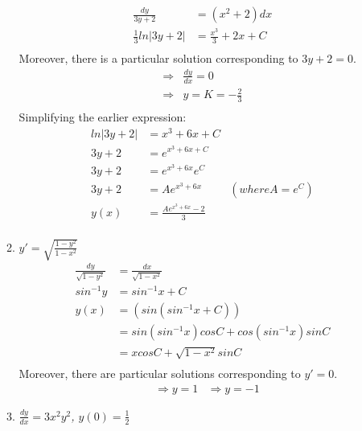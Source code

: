 \documentclass{article}
\begin{document}
\begin{enumerate}
\begin{enumerate}
\begin{align*}
                            \frac{dy}{3y+2}&=(x^2+2)dx \\
                            \frac{1}{3}ln|3y+2|&=\frac{x^3}{3}+2x+C \\
                        \end{align*}
                        Moreover, there is a particular solution corresponding to $3y+2=0$.
                        \begin{align*}
                            \Rightarrow& \frac{dy}{dx}=0 \\
                            \Rightarrow& y=K=-\frac{2}{3} \\
                        \end{align*}
                        Simplifying the earlier expression:
                        \begin{align*}
                            ln|3y+2|&=x^3+6x+C \\
                            3y+2&=e^{x^3+6x+C} \\
                            3y+2&=e^{x^3+6x}e^C \\
                            3y+2&=Ae^{x^3+6x}&(where A=e^C) \\
                            y(x)&=\frac{Ae^{x^3+6x}-2}{3} \\
                        \end{align*}
                    \item \textit{$y'=\sqrt{\frac{1-y^2}{1-x^2}}$}
                    \begin{align*}
                        \frac{dy}{\sqrt{1-y^2}}&=\frac{dx}{\sqrt{1-x^2}} \\
                        sin^{-1}y&=sin^{-1}x+C \\
                        y(x)&=(sin(sin^{-1}x+C)) \\
                        &=sin(sin^{-1}x)cosC+cos(sin^{-1}x)sinC \\
                        &=xcosC+\sqrt{1-x^2}sinC \\
                    \end{align*}
                    Moreover, there are particular solutions corresponding to $y'=0$.
                        \begin{align*}
                            &\Rightarrow y=1 &\Rightarrow y=-1
                        \end{align*}
                    \item \textit{$\frac{dy}{dx}=3x^2y^2$, $y(0)=\frac{1}{2}$}

\end{enumerate}
\end{enumerate}
\end{document}
